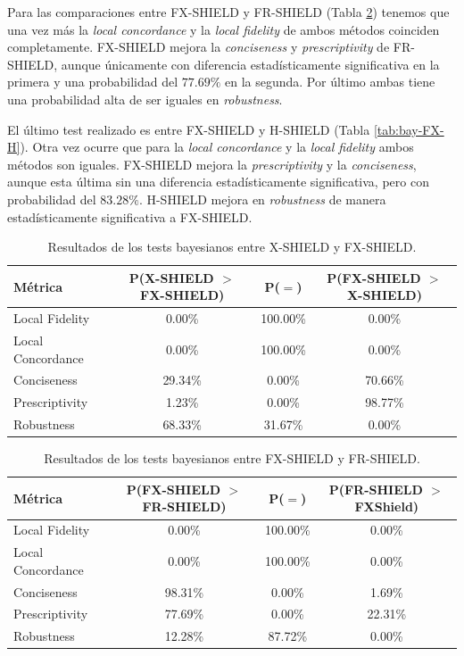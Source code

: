 Para las comparaciones entre FX-SHIELD y FR-SHIELD (Tabla \ref{tab:bay-FX-FR}) tenemos que una vez más la \textit{local concordance} y la \textit{local fidelity} de ambos métodos coinciden completamente. FX-SHIELD mejora la \textit{conciseness} y \textit{prescriptivity} de FR-SHIELD, aunque únicamente con diferencia estadísticamente significativa en la primera y una probabilidad del $77.69\%$ en la segunda. Por último ambas tiene una probabilidad alta de ser iguales en \textit{robustness}.

El último test realizado es entre FX-SHIELD y H-SHIELD (Tabla \ref{tab:bay-FX-H}). Otra vez ocurre que para la \textit{local concordance} y la \textit{local fidelity} ambos métodos son iguales. FX-SHIELD mejora la \textit{prescriptivity} y la \textit{conciseness}, aunque esta última sin una diferencia estadísticamente significativa, pero con probabilidad del $83.28\%$. H-SHIELD mejora en \textit{robustness} de manera estadísticamente significativa a FX-SHIELD.



\begin{table}[ht]
\centering
\begin{tabular}{lccc}
\toprule
\textbf{Métrica} & \textbf{P(X-SHIELD $>$ FX-SHIELD)} & \textbf{P($=$)} & \textbf{P(FX-SHIELD $>$ X-SHIELD)} \\
\midrule
Local Fidelity    & 0.00\%  & 100.00\% & 0.00\%  \\
Local Concordance & 0.00\%  & 100.00\% & 0.00\%  \\
Conciseness       & 29.34\% & 0.00\%  & 70.66\%  \\
Prescriptivity    & 1.23\%  & 0.00\%  & 98.77\%  \\
Robustness        & 68.33\% & 31.67\% & 0.00\% \\
\bottomrule
\end{tabular}
\caption{Resultados de los tests bayesianos entre X-SHIELD y FX-SHIELD.}
\label{tab:bay-X-FX}
\end{table}

\begin{table}[ht]
\centering
\begin{tabular}{lccc}
\toprule
\textbf{Métrica} & \textbf{P(FX-SHIELD $>$ FR-SHIELD)} & \textbf{P($=$)} & \textbf{P(FR-SHIELD $>$ FXShield)} \\
\midrule
Local Fidelity    & 0.00\%  & 100.00\% & 0.00\%  \\
Local Concordance & 0.00\%  & 100.00\% & 0.00\%  \\
Conciseness       & 98.31\% & 0.00\%  & 1.69\%  \\
Prescriptivity    & 77.69\% & 0.00\%  & 22.31\%  \\
Robustness        & 12.28\% & 87.72\% & 0.00\% \\
\bottomrule
\end{tabular}
\caption{Resultados de los tests bayesianos entre FX-SHIELD y FR-SHIELD.}
\label{tab:bay-FX-FR}
\end{table}



